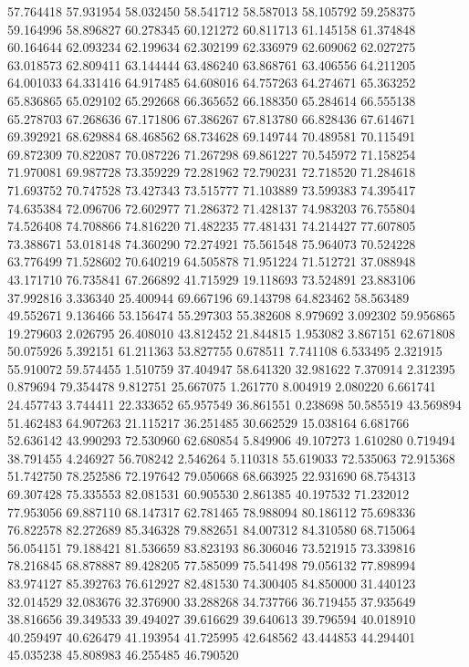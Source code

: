 57.764418
57.931954
58.032450
58.541712
58.587013
58.105792
59.258375
59.164996
58.896827
60.278345
60.121272
60.811713
61.145158
61.374848
60.164644
62.093234
62.199634
62.302199
62.336979
62.609062
62.027275
63.018573
62.809411
63.144444
63.486240
63.868761
63.406556
64.211205
64.001033
64.331416
64.917485
64.608016
64.757263
64.274671
65.363252
65.836865
65.029102
65.292668
66.365652
66.188350
65.284614
66.555138
65.278703
67.268636
67.171806
67.386267
67.813780
66.828436
67.614671
69.392921
68.629884
68.468562
68.734628
69.149744
70.489581
70.115491
69.872309
70.822087
70.087226
71.267298
69.861227
70.545972
71.158254
71.970081
69.987728
73.359229
72.281962
72.790231
72.718520
71.284618
71.693752
70.747528
73.427343
73.515777
71.103889
73.599383
74.395417
74.635384
72.096706
72.602977
71.286372
71.428137
74.983203
76.755804
74.526408
74.708866
74.816220
71.482235
77.481431
74.214427
77.607805
73.388671
53.018148
74.360290
72.274921
75.561548
75.964073
70.524228
63.776499
71.528602
70.640219
64.505878
71.951224
71.512721
37.088948
43.171710
76.735841
67.266892
41.715929
19.118693
73.524891
23.883106
37.992816
3.336340
25.400944
69.667196
69.143798
64.823462
58.563489
49.552671
9.136466
53.156474
55.297303
55.382608
8.979692
3.092302
59.956865
19.279603
2.026795
26.408010
43.812452
21.844815
1.953082
3.867151
62.671808
50.075926
5.392151
61.211363
53.827755
0.678511
7.741108
6.533495
2.321915
55.910072
59.574455
1.510759
37.404947
58.641320
32.981622
7.370914
2.312395
0.879694
79.354478
9.812751
25.667075
1.261770
8.004919
2.080220
6.661741
24.457743
3.744411
22.333652
65.957549
36.861551
0.238698
50.585519
43.569894
51.462483
64.907263
21.115217
36.251485
30.662529
15.038164
6.681766
52.636142
43.990293
72.530960
62.680854
5.849906
49.107273
1.610280
0.719494
38.791455
4.246927
56.708242
2.546264
5.110318
55.619033
72.535063
72.915368
51.742750
78.252586
72.197642
79.050668
68.663925
22.931690
68.754313
69.307428
75.335553
82.081531
60.905530
2.861385
40.197532
71.232012
77.953056
69.887110
68.147317
62.781465
78.988094
80.186112
75.698336
76.822578
82.272689
85.346328
79.882651
84.007312
84.310580
68.715064
56.054151
79.188421
81.536659
83.823193
86.306046
73.521915
73.339816
78.216845
68.878887
89.428205
77.585099
75.541498
79.056132
77.898994
83.974127
85.392763
76.612927
82.481530
74.300405
84.850000
31.440123
32.014529
32.083676
32.376900
33.288268
34.737766
36.719455
37.935649
38.816656
39.349533
39.494027
39.616629
39.640613
39.796594
40.018910
40.259497
40.626479
41.193954
41.725995
42.648562
43.444853
44.294401
45.035238
45.808983
46.255485
46.790520
